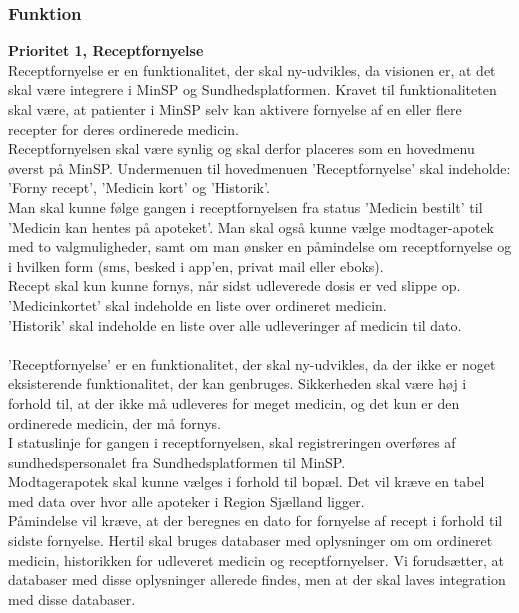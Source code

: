 \subsubsection{Funktion}
\textbf{Prioritet 1, Receptfornyelse}\\
Receptfornyelse er en funktionalitet, der skal ny-udvikles, da visionen er, at det skal være integrere i MinSP og Sundhedsplatformen. Kravet til funktionaliteten skal være, at patienter i MinSP selv kan aktivere fornyelse af en eller flere recepter for deres ordinerede medicin. 
\\
Receptfornyelsen skal være synlig og skal derfor placeres som en hovedmenu øverst på MinSP. Undermenuen til hovedmenuen 'Receptfornyelse' skal indeholde: 'Forny recept', 'Medicin kort' og 'Historik'.
\\
Man skal kunne følge gangen i receptfornyelsen fra status 'Medicin bestilt' til 'Medicin kan hentes på apoteket'. Man skal også kunne vælge modtager-apotek med to valgmuligheder, samt om man ønsker en påmindelse om receptfornyelse og i hvilken form (sms, besked i app'en, privat mail eller eboks). 
\\ 
Recept skal kun kunne fornys, når sidst udleverede dosis er ved slippe op.  
\\
'Medicinkortet' skal indeholde en liste over ordineret medicin.\\ 
'Historik' skal indeholde en liste over alle udleveringer af medicin til dato.
\\ \\
'Receptfornyelse' er en funktionalitet, der skal ny-udvikles, da der ikke er noget eksisterende funktionalitet, der kan genbruges. Sikkerheden skal være høj i forhold til, at der ikke må udleveres for meget medicin, og det kun er den ordinerede medicin, der må fornys. \\
I statuslinje for gangen i receptfornyelsen, skal registreringen overføres af sundhedspersonalet fra Sundhedsplatformen til MinSP.\\
Modtagerapotek skal kunne vælges i forhold til bopæl. Det vil kræve en tabel med data over hvor alle apoteker i Region Sjælland ligger.\\
Påmindelse vil kræve, at der beregnes en dato for fornyelse af recept i forhold til sidste fornyelse. Hertil skal bruges databaser med oplysninger om om ordineret medicin, historikken for udleveret medicin og receptfornyelser. Vi forudsætter, at databaser med disse oplysninger allerede findes, men at der skal laves integration med disse databaser.\\
